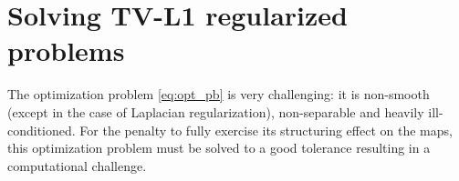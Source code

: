 
\section{Solving TV-L1 regularized problems}
The optimization problem \eqref{eq:opt_pb} is very challenging:
it is non-smooth (except in the case of Laplacian regularization), non-separable and heavily ill-conditioned. For the penalty to fully exercise its
structuring effect on the maps, this optimization problem must be
solved to a good tolerance resulting in a computational challenge.

